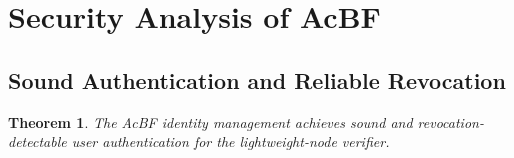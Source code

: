 \documentclass[conference]{IEEEtran}
\newtheorem{theorem}{Theorem}
\begin{document}

\section{Security Analysis of AcBF}\label{sec:security}
\subsection{Sound Authentication and Reliable Revocation}
\begin{theorem}\label{theo:security}
	The AcBF identity management achieves sound and revocation-detectable user authentication for the lightweight-node verifier.
\end{theorem}
\end{document}
